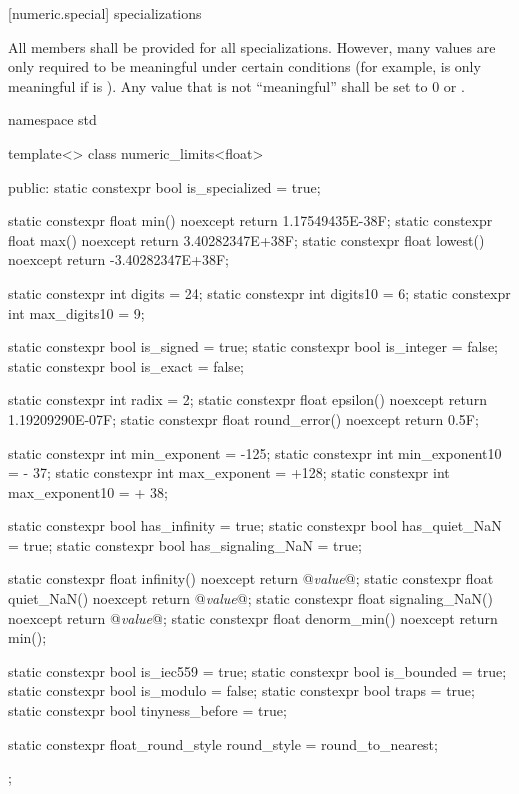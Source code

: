 [numeric.special]{ specializations}

\pnum
All members shall be provided for all specializations.
However, many values are only required to be meaningful under certain
conditions
(for example,
is only meaningful if
is
).
Any value that is not ``meaningful'' shall be set to 0 or
.

\pnum
\begin{example}
\begin{codeblock}
namespace std {
  template<> class numeric_limits<float> {
  public:
    static constexpr bool is_specialized = true;

    static constexpr float min() noexcept { return 1.17549435E-38F; }
    static constexpr float max() noexcept { return 3.40282347E+38F; }
    static constexpr float lowest() noexcept { return -3.40282347E+38F; }

    static constexpr int digits   = 24;
    static constexpr int digits10 =  6;
    static constexpr int max_digits10 =  9;

    static constexpr bool is_signed  = true;
    static constexpr bool is_integer = false;
    static constexpr bool is_exact   = false;

    static constexpr int radix = 2;
    static constexpr float epsilon() noexcept     { return 1.19209290E-07F; }
    static constexpr float round_error() noexcept { return 0.5F; }

    static constexpr int min_exponent   = -125;
    static constexpr int min_exponent10 = - 37;
    static constexpr int max_exponent   = +128;
    static constexpr int max_exponent10 = + 38;

    static constexpr bool has_infinity      = true;
    static constexpr bool has_quiet_NaN     = true;
    static constexpr bool has_signaling_NaN = true;

    static constexpr float infinity()      noexcept { return @\textit{value}@; }
    static constexpr float quiet_NaN()     noexcept { return @\textit{value}@; }
    static constexpr float signaling_NaN() noexcept { return @\textit{value}@; }
    static constexpr float denorm_min()    noexcept { return min(); }

    static constexpr bool is_iec559  = true;
    static constexpr bool is_bounded = true;
    static constexpr bool is_modulo  = false;
    static constexpr bool traps      = true;
    static constexpr bool tinyness_before = true;

    static constexpr float_round_style round_style = round_to_nearest;
  };
}
\end{codeblock}
\end{example}

